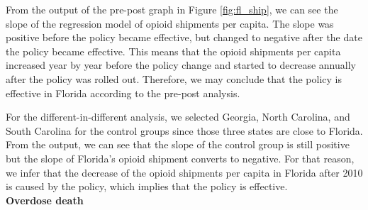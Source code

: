 \documentclass[12pt,letterpaper]{article}
\begin{document}
From the output of the pre-post graph in Figure \ref{fig:fl_ship}, we can see the slope of the regression model of opioid shipments per capita. The slope was positive before the policy became effective, but changed to negative after the date the policy became effective. This means that the opioid shipments per capita increased year by year before the policy change and started to decrease annually after the policy was rolled out. Therefore, we may conclude that the policy is effective in Florida according to the pre-post analysis.

For the different-in-different analysis, we selected Georgia, North Carolina, and South Carolina for the control groups since those three states are close to Florida. From the output, we can see that the slope of the control group is still positive but the slope of Florida's opioid shipment converts to negative. For that reason, we infer that the decrease of the opioid shipments per capita in Florida after 2010 is caused by the policy, which implies that the policy is effective. \\

\noindent \textbf{Overdose death} \\
\end{document}

